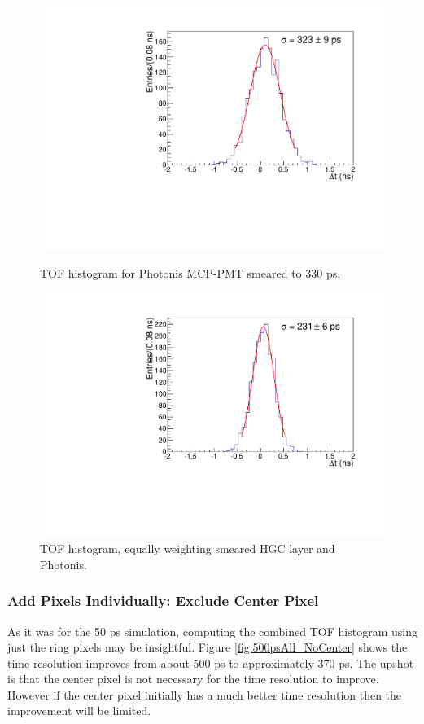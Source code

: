\documentclass[twocolumn,aps,prd,reprint,superscriptaddress,floatfix]{revtex4-1}
\begin{document}
\begin{figure}[!htbp]
\centering
\begin{minipage}[t]{0.49\textwidth}
	\includegraphics[width=\linewidth]{deltaTMCPSmear500.pdf}
	\caption{TOF histogram for Photonis MCP-PMT smeared to 330 ps.}
	\label{fig:500psMCP}
\end{minipage} \hfill
\begin{minipage}[t]{0.49\textwidth}
	\includegraphics[width=\linewidth]{deltaT_PicoSilEqual_MCP_Equal_BothSmear500.pdf}
	\caption{TOF histogram, equally weighting smeared HGC layer and Photonis.}
	\label{fig:500psHGCMCP}
\end{minipage}
\end{figure}

\subsubsection{Add Pixels Individually: Exclude Center Pixel}
As it was for the 50 ps simulation, computing the combined TOF histogram using just the ring pixels may be insightful.
Figure \ref{fig:500psAll_NoCenter} shows the time resolution improves from about 500 ps to approximately 370 ps. 
The upshot is that the center pixel is not necessary for the time resolution to improve.
However if the center pixel initially has a much better time resolution then the improvement will be limited.
\end{document}
